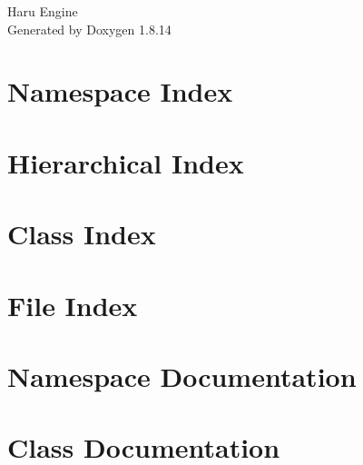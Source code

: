 \documentclass[twoside]{book}
\newcommand{\+}{\discretionary{\mbox{\scriptsize$\hookleftarrow$}}{}{}}
\newcommand{\clearemptydoublepage}{%
  \newpage{\pagestyle{empty}\cleardoublepage}%
}
\begin{document}
\hypersetup{pageanchor=false,
             bookmarksnumbered=true,
             pdfencoding=unicode
            }
\begin{titlepage}
\vspace*{7cm}
\begin{center}%
{\Large Haru Engine }\\
\vspace*{1cm}
{\large Generated by Doxygen 1.8.14}\\
\end{center}
\end{titlepage}
\clearemptydoublepage
{}
\tableofcontents
\clearemptydoublepage
{}
\hypersetup{pageanchor=true}

\chapter{Namespace Index}

\chapter{Hierarchical Index}

\chapter{Class Index}

\chapter{File Index}

\chapter{Namespace Documentation}

\chapter{Class Documentation}






















\end{document}
